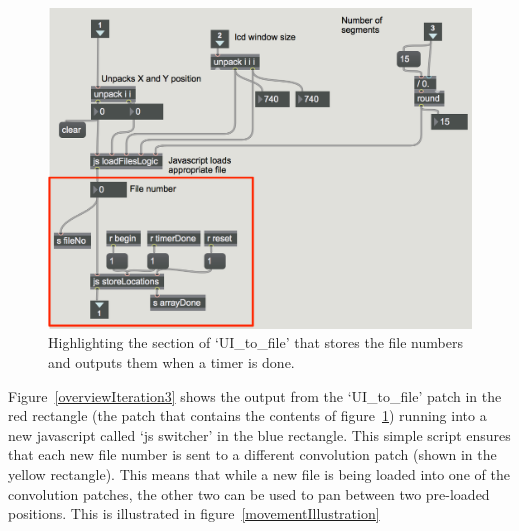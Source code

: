 \documentclass[../../main.tex]{subfiles}
\begin{document}
			\begin{figure}[H]
				\centerline{\includegraphics[scale = 0.6]{Sections/Implementation/Max/images/Max/Iteration3/storeLocations_edit.png}}
				\caption{Highlighting the section of `UI\_to\_file' that stores the file numbers and outputs them when a timer is done.}
				\label{storeLocations}
			\end{figure}

			Figure~\ref{overviewIteration3} shows the output from the `UI\_to\_file' patch in the red rectangle (the patch that contains the contents of figure~\ref{storeLocations}) running into a new javascript called `js switcher' in the blue rectangle. This simple script ensures that each new file number is sent to a different convolution patch (shown in the yellow rectangle). This means that while a new file is being loaded into one of the convolution patches, the other two can be used to pan between two pre-loaded positions. This is illustrated in figure~\ref{movementIllustration}\\
\end{document}
